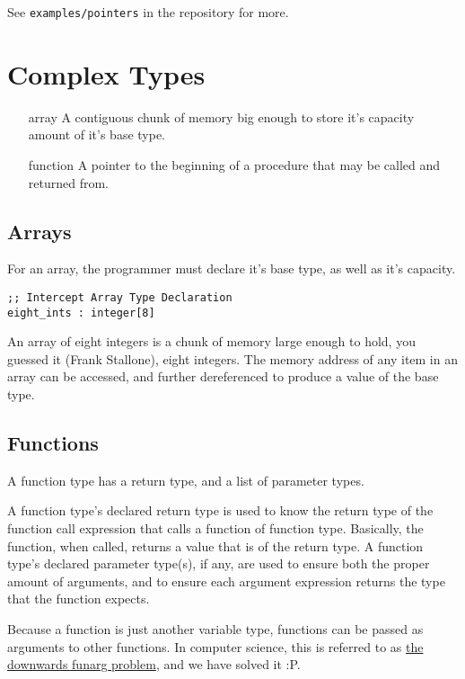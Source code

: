 \documentclass[12pt]{report}
\begin{document}
See \verb|examples/pointers| in the repository for more.

\section{Complex Types}
\label{subsec:types-complex-types}

\begin{itemize}
\item[array]    A contiguous chunk of memory big enough to store it's capacity amount of it's base type.
\item[function] A pointer to the beginning of a procedure that may be called and returned from.
\end{itemize}

\subsection*{Arrays}
\label{subsec:types-complex-types-arrays}
For an array, the programmer must declare it's base type, as well as it's capacity.
\begin{Verbatim}[samepage=true]
;; Intercept Array Type Declaration
eight_ints : integer[8]
\end{Verbatim}

An array of eight integers is a chunk of memory large enough to hold, you guessed it (Frank Stallone), eight integers. The memory address of any item in an array can be accessed, and further dereferenced to produce a value of the base type.

\subsection*{Functions}
\label{subsec:types-complex-types-functions}

A function type has a return type, and a list of parameter types.

A function type's declared return type is used to know the return type of the function call expression that calls a function of function type. Basically, the function, when called, returns a value that is of the return type.
A function type's declared parameter type(s), if any, are used to ensure both the proper amount of arguments, and to ensure each argument expression returns the type that the function expects.

Because a function is just another variable type, functions can be passed as arguments to other functions. In computer science, this is referred to as \href{https://en.wikipedia.org/wiki/Funarg_problem}{the downwards funarg problem}, and we have solved it :P.
\end{document}
